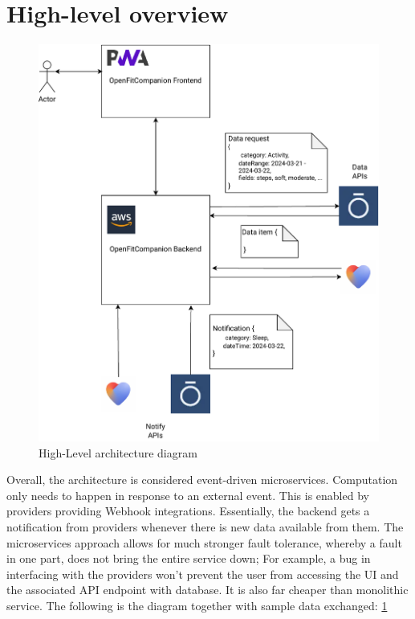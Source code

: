 \section{High-level overview}
\begin{figure}
    
    \centering
    \includegraphics[width=\textwidth,height=\textheight,keepaspectratio]{../images/highLevel.pdf}
    \caption{High-Level architecture diagram}
    \label{fig:1}
    
\end{figure}
Overall, the architecture is considered event-driven microservices. Computation only needs to happen in response to an external event. This is enabled by providers providing Webhook integrations. Essentially, the backend gets a notification from providers whenever there is new data available from them. The microservices approach allows for much stronger fault tolerance, whereby a fault in one part, does not bring the entire service down; For example, a bug in interfacing with the providers won't prevent the user from accessing the UI and the associated API endpoint with database. It is also far cheaper than monolithic service. The following is the diagram together with sample data exchanged: \ref{fig:1}

